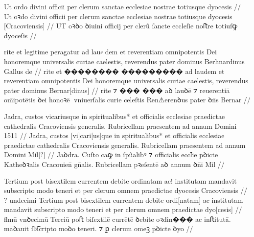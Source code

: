 


\ex \bg
\gla
{} %
Ut ordo divini officii per clerum sanctae ecclesiae  nostrae totiusque 
dyocesis {}
//
\glRekonstrukcja
{}
Ut oꝛdo divini officii per clerum sanctae ecclesiae {} nostrae  totiusque 
dyocesis [Cracoviensis]
//
\glU
{}
UT oꝛꝺo ꝺiuini officij per clerũ ſancte eccleſie {} noﬅre  totiuſꝙ
dyoceſis {}
//
\endgl
\xe

\ex \bg
\gla
{}
rite et legitime peragatur ad {lau⸗  dem} et reverentiam 
omnipotentis Dei honoremque universalis curiae caelestis, reverendus 
pater dominus Berhnardinus Gallus de
//
\glRekonstrukcja
{}
rite et {��������} {���������} ad laudem et reverentiam 
omnipotentis Dei honoremque universalis curiae caelestis, reverendus 
pater dominus Bernar[dinus] {} {}
//
\glU
{}
rite ⁊ {���} {���} aꝺ lauꝺē ⁊ reuerentiā om̄ipotētis ꝺei honoꝛē vniuerſalis curie celeſtis Ren⚠erenꝺus pater ꝺn̄s Bernar
//
\endgl
\xe


\ex \bg
\gla
{}
Jadra, custos vicariusque  in spiritualibus* et officialis ecclesiae praedictae cathedralis Cracoviensis 
generalis.
Rubricellam  praesentem ad annum Domini 1511
//
\glRekonstrukcja
{}
Jadra, custos [vi]cari[us]que {} in spiritualibus* et officialis ecclesiae praedictae cathedralis Cracoviensis 
generalis.
Rubricellam  praesentem ad annum Domini Mil[?]
//
\glU
{}
Jaꝺdra. Cuſto caꝙ
{} in ſpũalibꝰ ⁊ oﬀicialis eccꝉie p̄ꝺicte Katheꝺꝛalis Cracouien̄ gn̄alis. Rubricellam  pꝛeſentē aꝺ annum ꝺn̄i Mil
//
\endgl
\xe


\ex \bg
\gla
{}
{} {}  Tertium 
post bisextilem  currentem debite ordinatam ac! institutam mandavit 
subscripto modo teneri et per clerum omnem praedictae dyocesis Cracoviensis
{}
//
\glRekonstrukcja
{}
{?} undecimi  Tertium 
post bisextilem {} currentem debite ordi[natam] ac institutam mandavit 
subscripto modo teneri et per clerum omnem praedictae dyo[cesis]
{}
//
\glU
{}
ﬂmū vnꝺecimū  Terciū poﬅ biſextilē {} currētē ꝺebite oꝛdin��� ac inﬅitutā. māꝺauit ſƀ͡ſcripto moꝺo teneri. ⁊ ꝑ  clerum om̄eꝫ p̄ꝺicte ꝺyo
{}
//
\endgl
\xe



